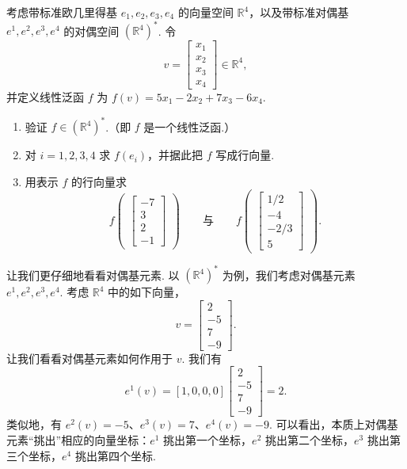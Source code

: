 \begin{question}\label{q:1-10}
考虑带标准欧几里得基 $e_1,e_2,e_3,e_4$ 的向量空间 $\mathbb{R}^4$，以及带标准对偶基 $e^1,e^2,e^3,e^4$ 的对偶空间 $(\mathbb{R}^4)^*$. 令
\[
v=\begin{bmatrix}x_1\\x_2\\x_3\\x_4\end{bmatrix}\in\mathbb{R}^4,
\]
并定义线性泛函 $f$ 为 $f(v)=5x_1-2x_2+7x_3-6x_4$.
\begin{enumerate}
  \item[(a)] 验证 $f\in(\mathbb{R}^4)^*$.（即 $f$ 是一个线性泛函.）
  \item[(b)] 对 $i=1,2,3,4$ 求 $f(e_i)$，并据此把 $f$ 写成行向量.
  \item[(c)] 用表示 $f$ 的行向量求
  \[
  f\begin{pmatrix}\begin{bmatrix}-7\\3\\2\\-1\end{bmatrix}\end{pmatrix}
  \qquad\text{与}\qquad
  f\begin{pmatrix}\begin{bmatrix}1/2\\-4\\-2/3\\5\end{bmatrix}\end{pmatrix}.
  \]
\end{enumerate}
\end{question}

让我们更仔细地看看对偶基元素. 以 $(\mathbb{R}^4)^*$ 为例，我们考虑对偶基元素 $e^1,e^2,e^3,e^4$. 考虑 $\mathbb{R}^4$ 中的如下向量，
\[
v=\begin{bmatrix}2\\-5\\7\\-9\end{bmatrix}.
\]
让我们看看对偶基元素如何作用于 $v$. 我们有
\[
e^1(v)=[1,0,0,0]\begin{bmatrix}2\\-5\\7\\-9\end{bmatrix}=2.
\]
类似地，有 $e^2(v)=-5$、$e^3(v)=7$、$e^4(v)=-9$. 可以看出，本质上对偶基元素``挑出''相应的向量坐标：$e^1$ 挑出第一个坐标，$e^2$ 挑出第二个坐标，$e^3$ 挑出第三个坐标，$e^4$ 挑出第四个坐标.


